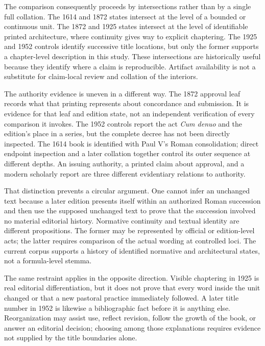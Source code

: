 The comparison consequently proceeds by intersections rather than by a
single full collation. The 1614 and 1872 states intersect at the level of a
bounded or continuous unit. The 1872 and 1925 states intersect at the level
of identifiable printed architecture, where continuity gives way to explicit
chaptering. The 1925 and 1952 controls identify successive title locations,
but only the former supports a chapter-level description in this study.
These intersections are historically useful because they identify where a
claim is reproducible. Artifact availability is not a substitute for
claim-local review and collation of the interiors.

The authority evidence is uneven in a different way. The 1872 approval leaf
records what that printing represents about concordance and submission. It is
evidence for that leaf and edition state, not an independent verification of
every comparison it invokes. The 1952 controls report the act
\emph{Cum denuo} and the edition's place in a series, but the complete decree
has not been directly inspected. The 1614 book is identified with Paul V's
Roman consolidation; direct endpoint inspection and a later collation
together control its outer sequence at different depths. An issuing authority, a printed claim
about approval, and a modern scholarly report are three different evidentiary
relations to authority.

That distinction prevents a circular argument. One cannot infer an unchanged
text because a later edition presents itself within an authorized Roman
succession and then use the supposed unchanged text to prove that the
succession involved no material editorial history. Normative continuity and
textual identity are different propositions. The former may be represented
by official or edition-level acts; the latter requires comparison of the
actual wording at controlled loci. The current corpus supports a history of
identified normative and architectural states, not a formula-level stemma.

The same restraint applies in the opposite direction. Visible chaptering in
1925 is real editorial differentiation, but it does not prove that every word
inside the unit changed or that a new pastoral practice immediately followed.
A later title number in 1952 is likewise a bibliographic fact before it is
anything else. Reorganization may assist use, reflect revision, follow the
growth of the book, or answer an editorial decision; choosing among those
explanations requires evidence not supplied by the title boundaries alone.

